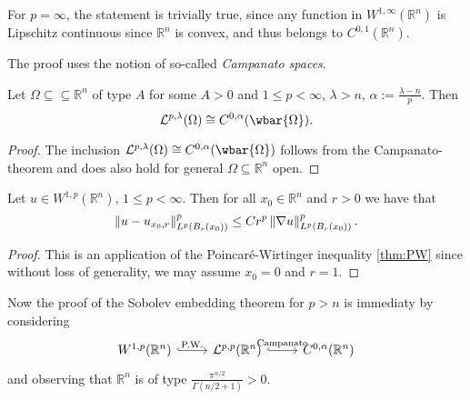 \begin{remark}
	For $p = \infty$, the statement is trivially true, since any function in $W^{1,\infty}(\mathbb{R}^n)$ is Lipschitz continuous since $\mathbb{R}^n$ is convex, and thus belongs to $C^{0,1}(\mathbb{R}^n)$.
\end{remark}

The proof uses the notion of so-called \emph{Campanato spaces}. 

\begin{theorem}
	Let $\Omega \subseteq \subseteq \mathbb{R}^n$ of type $A$ for some $A > 0$ and $1 \leq p < \infty$, $\lambda > n$, $\alpha := \frac{\lambda - n}{p}$. Then
	\begin{equation*}
		\mathcal{L}^{p,\lambda}(\Omega) \cong C^{0,\alpha}(\wbar{\Omega}).
	\end{equation*}
\end{theorem}

\begin{proof}
	The inclusion $\mathcal{L}^{p,\lambda}(\Omega) \cong C^{0,\alpha}(\wbar{\Omega})$ follows from the Campanato-theorem and does also hold for general $\Omega \subseteq \mathbb{R}^n$ open.
\end{proof}

\begin{lemma}
	Let $u \in W^{1,p}(\mathbb{R}^n)$, $1 \leq p < \infty$. Then for all $x_0 \in \mathbb{R}^n$ and $r > 0$ we have that
	\begin{equation*}
		\norm[0]{u - u_{x_0,r}}_{L^p(B_r(x_0))}^p \leq Cr^p \norm[0]{\nabla u}^p_{L^p(B_r(x_0))}.
	\end{equation*}
\end{lemma}

\begin{proof}
	This is an application of the Poincar\'e-Wirtinger inequality \ref{thm:PW} since without loss of generality, we may assume $x_0 = 0$ and $r = 1$.
\end{proof}

Now the proof of the Sobolev embedding theorem for $p > n$ is immediaty by considering
\begin{equation*}
	\begin{tikzcd}
		W^{1,p}(\mathbb{R}^n) \arrow[r,"\text{P.W.}",hook] & \mathcal{L}^{p,p}(\mathbb{R}^n) \arrow[r,"\text{Campanato}",hook] & C^{0,\alpha}(\mathbb{R}^n)
	\end{tikzcd}
\end{equation*}
\noindent and observing that $\mathbb{R}^n$ is of type $\frac{\pi^{n/2}}{\Gamma(n/2 + 1)} > 0$.

